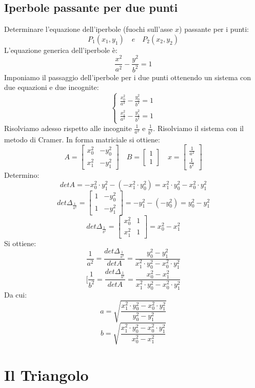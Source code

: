 \documentclass[12pt]{book}
\begin{document}
			\section{Iperbole passante per due punti}
			Determinare l'equazione dell'iperbole (fuochi sull'asse $x$) passante per i punti:
			\[P_1(x_1,y_1)\quad e \quad P_2(x_2,y_2)\]
			L'equazione generica dell'iperbole è:
			\[\frac{x^2}{a^2}-\frac{y^2}{b^2}=1\]
			Imponiamo il passaggio dell'iperbole per i due punti ottenendo un sistema con due equazioni e due incognite:
			\[\begin{cases}
				\frac{x_0^2}{a^2}-\frac{y_0^2}{b^2}=1\\
				\frac{x_1^2}{a^2}-\frac{y_1^2}{b^2}=1
			\end{cases}\]
			Risolviamo adesso rispetto alle incognite $\frac{1}{a^2}$ e $\frac{1}{b^2}$. Risolviamo il sistema con il metodo di Cramer. In forma matriciale si ottiene:
			\[A=\begin{bmatrix}
				x_0^2 & -y_0^2\\
				x_1^2&-y_1^2
			\end{bmatrix}\quad
			B=\begin{bmatrix}
				1\\1
			\end{bmatrix}\quad
			x=\begin{bmatrix}
				\frac{1}{a^2}\\
				\frac{1}{b^2}
			\end{bmatrix}\]
			Determino:
			\[detA=-x_0^2\cdot y_1^2-\left(-x_1^2\cdot y_0^2\right)= x_1^2\cdot y_0^2-x_0^2\cdot y_1^2\]
			\[det\Delta_{\frac{1}{a^2}}=\begin{bmatrix}1&-y_0^2\\1&-y_1^2\end{bmatrix}=-y_1^2-\left(-y_0^2\right)=y_0^2-y_1^2\]
			\[det\Delta_{\frac{1}{b^2}}=\begin{bmatrix}x_0^2&1\\x_1^2&1\end{bmatrix}=x_0^2-x_1^2\]
			Si ottiene:
			\[\frac{1}{a^2}=\frac{det\Delta_{\frac{1}{a^2}}}{detA}=\frac{y_0^2-y_1^2}{x_1^2\cdot y_0^2-x_0^2\cdot y_1^2}\]
			\[[\frac{1}{b^2}=\frac{det\Delta_{\frac{1}{b^2}}}{detA}=\frac{x_0^2-x_1^2}{x_1^2\cdot y_0^2-x_0^2\cdot y_1^2}\]
			Da cui:
			\[a=\sqrt{\frac{x_1^2\cdot y_0^2-x_0^2\cdot y_1^2}{y_0^2-y_1^2}}\]
			\[b=\sqrt{\frac{x_1^2\cdot y_0^2-x_0^2\cdot y_1^2}{x_0^2-x_1^2}}\]
			
	\chapter{Il Triangolo}
\end{document}
